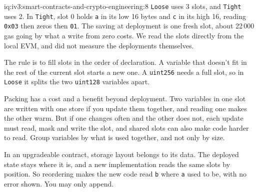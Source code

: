 \begin{solution}{iq:iv3:smart-contracts-and-crypto-engineering:8}
\texttt{Loose} uses 3 slots, and \texttt{Tight} uses 2. In \texttt{Tight}, slot 0 holds \texttt{a} in its low 16 bytes and \texttt{c} in its high 16, reading \texttt{0x03} then zeros then \texttt{01}. The saving at deployment is one fresh slot, about 22\,000 gas going by what a write from zero costs. We read the slots directly from the local EVM, and did not measure the deployments themselves.

The rule is to fill slots in the order of declaration. A variable that doesn't fit in the rest of the current slot starts a new one. A \texttt{uint256} needs a full slot, so in \texttt{Loose} it splits the two \texttt{uint128} variables apart.

Packing has a cost and a benefit beyond deployment. Two variables in one slot are written with one store if you update them together, and reading one makes the other warm. But if one changes often and the other does not, each update must read, mask and write the slot, and shared slots can also make code harder to read. Group variables by what is used together, and not only by size.

In an upgradeable contract, storage layout belongs to its data. The deployed state stays where it is, and a new implementation reads the same slots by position. So reordering makes the new code read \texttt{b} where \texttt{a} used to be, with no error shown. You may only append.

\end{solution}

